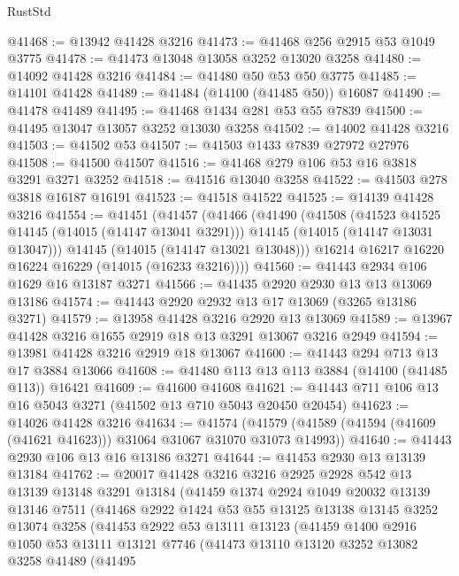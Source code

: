\begin{lexlean}{RustStd}
\begin{coremodule}
@41468 := @13942 @41428 @3216
@41473 := @41468 @256 @2915 @53 @1049 @3775
@41478 := @41473 @13048 @13058 @3252 @13020 @3258
@41480 := @14092 @41428 @3216
@41484 := @41480 @50 @53 @50 @3775
@41485 := @14101 @41428
@41489 := @41484 (@14100 (@41485 @50)) @16087
@41490 := @41478 @41489
@41495 := @41468 @1434 @281 @53 @55 @7839
@41500 := @41495 @13047 @13057 @3252 @13030 @3258
@41502 := @14002 @41428 @3216
@41503 := @41502 @53
@41507 := @41503 @1433 @7839 @27972 @27976
@41508 := @41500 @41507
@41516 := @41468 @279 @106 @53 @16 @3818 @3291 @3271 @3252
@41518 := @41516 @13040 @3258
@41522 := @41503 @278 @3818 @16187 @16191
@41523 := @41518 @41522
@41525 := @14139 @41428 @3216
@41554 := @41451
    (@41457
      (@41466
        (@41490
          (@41508
            (@41523 @41525 @14145 (@14015 (@14147 @13041 @3291)))
            @14145
            (@14015 (@14147 @13031 @13047)))
          @14145
          (@14015 (@14147 @13021 @13048)))
        @16214
        @16217
        @16220
        @16224
        @16229
        (@14015 (@16233 @3216))))
@41560 := @41443 @2934 @106 @1629 @16 @13187 @3271
@41566 := @41435 @2920 @2930 @13 @13 @13069 @13186
@41574 := @41443 @2920 @2932 @13 @17 @13069 (@3265 @13186 @3271)
@41579 := @13958 @41428 @3216 @2920 @13 @13069
@41589 := @13967 @41428 @3216 @1655 @2919 @18 @13 @3291 @13067 @3216 @2949
@41594 := @13981 @41428 @3216 @2919 @18 @13067
@41600 := @41443 @294 @713 @13 @17 @3884 @13066
@41608 := @41480 @113 @13 @113 @3884 (@14100 (@41485 @113)) @16421
@41609 := @41600 @41608
@41621 := @41443 @711 @106 @13 @16 @5043 @3271 (@41502 @13 @710 @5043 @20450 @20454)
@41623 := @14026 @41428 @3216
@41634 := @41574
    (@41579 (@41589 (@41594 (@41609 (@41621 @41623))) @31064 @31067 @31070 @31073 @14993))
@41640 := @41443 @2930 @106 @13 @16 @13186 @3271
@41644 := @41453 @2930 @13 @13139 @13184
@41762 := @20017
    @41428
    @3216
    @3216
    @2925
    @2928
    @542
    @13
    @13139
    @13148
    @3291
    @13184
    (@41459
      @1374
      @2924
      @1049
      @20032
      @13139
      @13146
      @7511
      (@41468
        @2922
        @1424
        @53
        @55
        @13125
        @13138
        @13145
        @3252
        @13074
        @3258
        (@41453
          @2922
          @53
          @13111
          @13123
          (@41459
            @1400
            @2916
            @1050
            @53
            @13111
            @13121
            @7746
            (@41473
              @13110
              @13120
              @3252
              @13082
              @3258
              @41489
              (@41495

\end{coremodule}
\end{lexlean}
